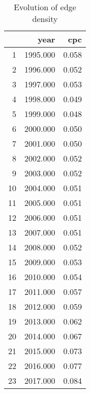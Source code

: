 \begin{table}[ht]
\centering
\begin{tabular}{rrr}
  \hline
 & year & cpc \\ 
  \hline
1 & 1995.000 & 0.058 \\ 
  2 & 1996.000 & 0.052 \\ 
  3 & 1997.000 & 0.053 \\ 
  4 & 1998.000 & 0.049 \\ 
  5 & 1999.000 & 0.048 \\ 
  6 & 2000.000 & 0.050 \\ 
  7 & 2001.000 & 0.050 \\ 
  8 & 2002.000 & 0.052 \\ 
  9 & 2003.000 & 0.052 \\ 
  10 & 2004.000 & 0.051 \\ 
  11 & 2005.000 & 0.051 \\ 
  12 & 2006.000 & 0.051 \\ 
  13 & 2007.000 & 0.051 \\ 
  14 & 2008.000 & 0.052 \\ 
  15 & 2009.000 & 0.053 \\ 
  16 & 2010.000 & 0.054 \\ 
  17 & 2011.000 & 0.057 \\ 
  18 & 2012.000 & 0.059 \\ 
  19 & 2013.000 & 0.062 \\ 
  20 & 2014.000 & 0.067 \\ 
  21 & 2015.000 & 0.073 \\ 
  22 & 2016.000 & 0.077 \\ 
  23 & 2017.000 & 0.084 \\ 
   \hline
\end{tabular}
\caption{Evolution of edge density} 
\end{table}
